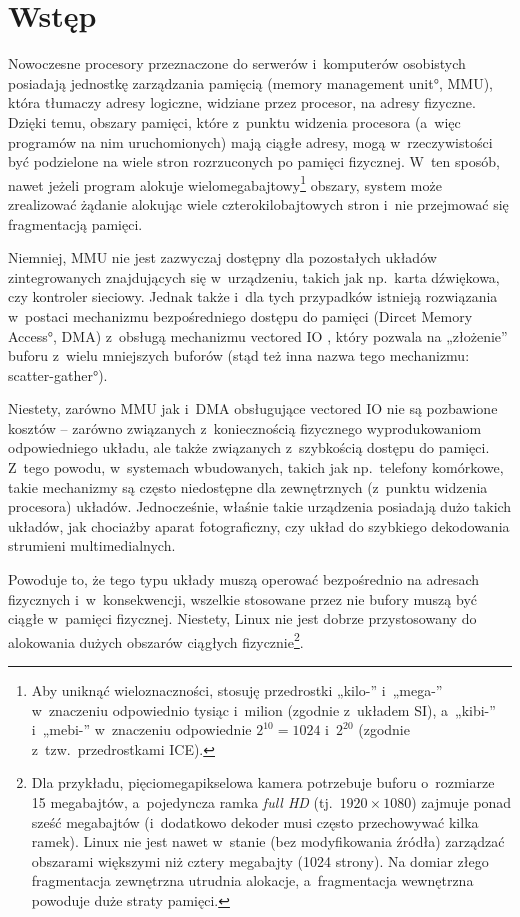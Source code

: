 \chapter{Wstęp}

Nowoczesne procesory przeznaczone do serwerów i~komputerów osobistych
posiadają jednostkę zarządzania pamięcią (\ang{memory management
  unit}, MMU), która tłumaczy adresy logiczne, widziane przez
procesor, na adresy fizyczne.  Dzięki temu, obszary pamięci, które
z~punktu widzenia procesora (a~więc programów na nim uruchomionych)
mają ciągłe adresy, mogą w~rzeczywistości być podzielone na wiele
stron rozrzuconych po pamięci fizycznej.  W~ten sposób, nawet jeżeli
program alokuje wielomegabajtowy\footnote{Aby uniknąć wieloznaczności,
  stosuję przedrostki „kilo-” i~„mega-” w~znaczeniu odpowiednio tysiąc
  i~milion (zgodnie z~układem SI), a~„kibi-” i~„mebi-” w~znaczeniu
  odpowiednie $2^{10} = 1024$ i~$2^{20}$ (zgodnie
  z~tzw.\ przedrostkami ICE).} obszary, system może zrealizować
żądanie alokując wiele czterokilobajtowych stron i~nie przejmować się
fragmentacją pamięci.

Niemniej, MMU nie jest zazwyczaj dostępny dla pozostałych układów
zintegrowanych znajdujących się w~urządzeniu, takich jak np.\ karta
dźwiękowa, czy kontroler sieciowy.  Jednak także i~dla tych przypadków
istnieją rozwiązania w~postaci mechanizmu bezpośredniego dostępu do
pamięci (\ang{Dircet Memory Access}, DMA) z~obsługą mechanizmu
vectored IO , który pozwala na „złożenie” buforu
z~wielu mniejszych buforów (stąd też inna nazwa tego mechanizmu:
\ang{scatter-gather}).

Niestety, zarówno MMU jak i~DMA obsługujące vectored IO
 nie są pozbawione kosztów -- zarówno związanych
z~koniecznością fizycznego wyprodukowaniom odpowiedniego układu, ale
także związanych z~szybkością dostępu do pamięci.  Z~tego powodu,
w~systemach wbudowanych, takich jak np.\ telefony komórkowe, takie
mechanizmy są często niedostępne dla zewnętrznych (z~punktu widzenia
procesora) układów.  Jednocześnie, właśnie takie urządzenia posiadają
dużo takich układów, jak chociażby aparat fotograficzny, czy układ do
szybkiego dekodowania strumieni multimedialnych.

Powoduje to, że tego typu układy muszą operować bezpośrednio na
adresach fizycznych i~w~konsekwencji, wszelkie stosowane przez nie
bufory muszą być ciągłe w~pamięci fizycznej.  Niestety, Linux nie jest
dobrze przystosowany do alokowania dużych obszarów ciągłych
fizycznie\footnote{Dla przykładu,
  pięciomegapikselowa kamera potrzebuje buforu o~rozmiarze 15
  megabajtów, a~pojedyncza ramka {\it full HD} (tj.\ $1920 \times
  1080$) zajmuje ponad sześć megabajtów (i~dodatkowo dekoder musi
  często przechowywać kilka ramek).  Linux nie jest nawet w~stanie
  (bez modyfikowania źródła) zarządzać obszarami większymi niż cztery
  megabajty (1024 strony).  Na domiar złego fragmentacja zewnętrzna
  utrudnia alokacje, a~fragmentacja wewnętrzna powoduje duże straty
  pamięci.}.

